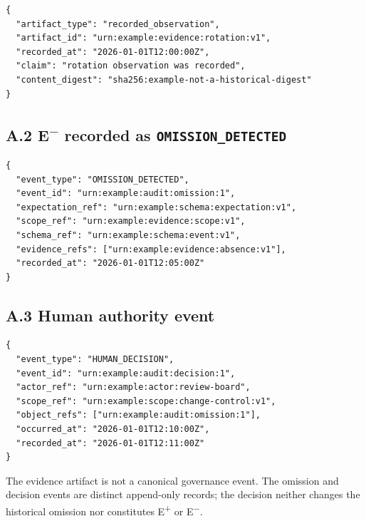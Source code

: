 \documentclass[conference]{IEEEtran}
\begin{document}
\begin{lstlisting}[basicstyle=\ttfamily\scriptsize,breaklines=true,caption={Synthetic evidence artifact supporting E\textsuperscript{+}.},label={lst:recorded-occurrence}]
{
  "artifact_type": "recorded_observation",
  "artifact_id": "urn:example:evidence:rotation:v1",
  "recorded_at": "2026-01-01T12:00:00Z",
  "claim": "rotation observation was recorded",
  "content_digest": "sha256:example-not-a-historical-digest"
}
\end{lstlisting}

\subsection*{A.2 E\textsuperscript{$-$} recorded as \texttt{OMISSION\_DETECTED}}

\begin{lstlisting}[basicstyle=\ttfamily\scriptsize,breaklines=true,caption={Synthetic Core-conformant omission event.},label={lst:recorded-omission}]
{
  "event_type": "OMISSION_DETECTED",
  "event_id": "urn:example:audit:omission:1",
  "expectation_ref": "urn:example:schema:expectation:v1",
  "scope_ref": "urn:example:evidence:scope:v1",
  "schema_ref": "urn:example:schema:event:v1",
  "evidence_refs": ["urn:example:evidence:absence:v1"],
  "recorded_at": "2026-01-01T12:05:00Z"
}
\end{lstlisting}

\subsection*{A.3 Human authority event}

\begin{lstlisting}[basicstyle=\ttfamily\scriptsize,breaklines=true,breakatwhitespace=true,columns=fullflexible,caption={Synthetic Core-conformant human decision.},label={lst:human-authority-closure}]
{
  "event_type": "HUMAN_DECISION",
  "event_id": "urn:example:audit:decision:1",
  "actor_ref": "urn:example:actor:review-board",
  "scope_ref": "urn:example:scope:change-control:v1",
  "object_refs": ["urn:example:audit:omission:1"],
  "occurred_at": "2026-01-01T12:10:00Z",
  "recorded_at": "2026-01-01T12:11:00Z"
}
\end{lstlisting}

The evidence artifact is not a canonical governance event. The omission and
decision events are distinct append-only records; the decision neither changes
the historical omission nor constitutes E\textsuperscript{+} or
E\textsuperscript{$-$}.
\end{document}
